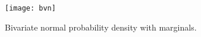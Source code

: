 \documentclass[12pt]{article}
\begin{document}
\begin{figure}
  \centering
  \texttt{[image: bvn]}
  \begin{comment}

    Note that there is a bug in the gs exporter that makes using the
    graph3 axes not work.
    See
    https://sourceforge.net/p/asymptote/discussion/409349/thread/a52414e613/
    After the bug gets fixed, the following should work.
\begin{asy}
settings.outformat = "pdf";
settings.prc=false;
settings.render=0;

import graph3;
import contour;
import grid3;
import palette;

size(5inches);

real myfontsize = 12;
real mylineskip = 1.2*myfontsize;
pen mypen = fontsize(myfontsize, mylineskip);
defaultpen(mypen);

currentprojection=orthographic(-4,-4,2);
limits((-2,-2,0),(2,2,0.5));

real rho = 0.8;

real id( real t) { return t;}
real n( real t) { return  (1/(sqrt(2 * pi))) * exp( -t^2 / 2); }
real two( real t) {return 2;}

path3 margx = graph(id, two, n, -2, 2, operator ..);
draw( margx, red);
path3 margy = graph(two, id, n, -2, 2, operator ..);
draw( margy, red);

real f(pair z) {
    real rho = 0.8;
  return (1/(2 * pi * sqrt(1 - rho^2))) *
    exp( -(z.x^2 - 2 * rho * z.x * z.y +  z.y^2) / 2);
}

surface s=surface(f,(-2,-2),(2,2),20,Spline);

pen[] Palette=Grayscale();
draw(s,surfacepen=mean(palette(s.map(zpart),Palette))
      ,meshpen=black,nolight);

grid3(new grid3routines [] {XYXgrid, ZXZgrid(2), ZYZgrid(2)},
      Step=0.25,
      pGrid=new pen[] {red, blue, black},
      pgrid=new pen[] {0.5red, lightgray, lightgray});

xaxis3(  Label("$x$",position=MidPoint,align=SE),
 Bounds(Min,Min),
 OutTicks());
 yaxis3( Label("$y$",position=MidPoint,align=SW),
 Bounds(Min,Min),
 OutTicks());
zaxis3( Label("$z$",position=EndPoint, align=Z),
  Bounds(Min,Max),
  InTicks(beginlabel=false,endlabel=true,Label(align=Y)),
  arrow=Arrow3
  );
zaxis3( Label("$z$",position=EndPoint, align=Z),
  Bounds(Max,Min),
  InTicks(beginlabel=false,endlabel=true,Label(align=X)),
  arrow=Arrow3
  );
\end{asy}
\end{comment}
    \caption{Bivariate normal probability density with marginals.}%
    \label{fig:gibbssampler:bivarnorm}
\end{figure}
\end{document}
